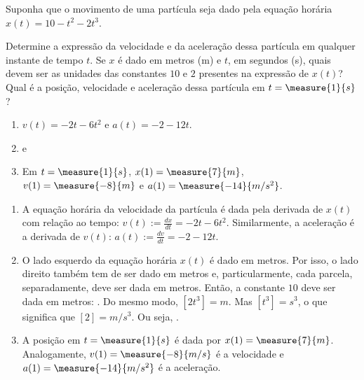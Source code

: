 \begin{question}
	Suponha que o movimento de uma partícula seja dado pela equação horária $x(t) = 10 - t^2 - 2t^3$.
	\begin{inlineenum}
		\inlineitem Determine a expressão da velocidade e da aceleração dessa partícula em qualquer instante de tempo $t$.
		\inlineitem Se $x$ é dado em metros (\unit{m}) e $t$, em segundos (\unit{s}), quais devem ser as unidades das constantes $10$ e $2$ presentes na expressão de $x(t)$?
		\inlineitem Qual é a posição, velocidade e aceleração dessa partícula em $t = \measure{1}{s}$?
	\end{inlineenum}

	\begin{answer}
		\begin{enumerate}
			\item $v(t) = -2t - 6t^2$ e $a(t) = -2 - 12t$.
			\item {} e 
			\item Em $t = \measure{1}{s}$, $x(1) = \measure{7}{m}$, $v(1) = \measure{-8}{m}$ e $a(1) = \measure{-14}{m/s^2}$.
		\end{enumerate}
	\end{answer}

	\begin{solution}
		\begin{enumerate}
			\item A equação horária da velocidade da partícula é dada pela derivada de $x(t)$ com relação ao tempo: $v(t) := \frac{dx}{dt} = -2t - 6t^2$.
			Similarmente, a aceleração é a derivada de $v(t)$: $a(t) := \frac{dv}{dt} = -2 - 12t$.
			\item O lado esquerdo da equação horária $x(t)$ é dado em metros.
			Por isso, o lado direito também tem de ser dado em metros e, particularmente, cada parcela, separadamente, deve ser dada em metros.
			Então, a constante $10$ deve ser dada em metros: .
			Do mesmo modo, $[2t^3] = \unit{m}$.
			Mas $[t^3] = \unit{s^3}$, o que significa que $[2] = \unit{m/s^3}$.
			Ou seja, .
			\item A posição em $t = \measure{1}{s}$ é dada por $x(1) = \measure{7}{m}$.
			Analogamente, $v(1) = \measure{-8}{m/s}$ é a velocidade e $a(1) = \measure{-14}{m/s^2}$ é a aceleração.
		\end{enumerate}
	\end{solution}
\end{question}